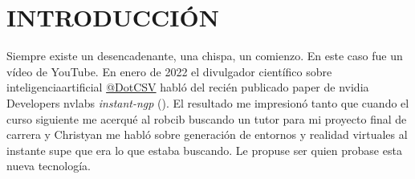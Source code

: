 \documentclass[a4paper, 12pt, spanish, twoside]{article}
\newcommand\blankpage{%
    \null
    \thispagestyle{empty}%
    \newpage}
\begin{document}




\newpage

\renewcommand{\listfigurename}{ÍNDICE DE FIGURAS} %
\listoffigures %

\clearpage





\newpage

\listofcodes %

\clearpage
\afterpage{\blankpage} %




\newpage
{}




\newpage
\section{INTRODUCCIÓN} \label{sec:introduccion}

Siempre existe un desencadenante, una chispa, un comienzo. En este caso fue un vídeo de YouTube. En enero de 2022 el divulgador científico sobre \gls{inteligenciaartificial} \href{https://www.youtube.com/@DotCSV}{@DotCSV} habló del recién publicado paper de \gls{nvidia} Developers \gls{nvlabs} \textit{instant-ngp} (\cite{mueller2022instant}). El resultado me impresionó tanto que cuando el curso siguiente me acerqué al \acrfull{robcib} buscando un tutor para mi proyecto final de carrera y Christyan me habló sobre generación de entornos y realidad virtuales al instante supe que era lo que estaba buscando. Le propuse ser quien probase esta nueva tecnología. 
\end{document}
